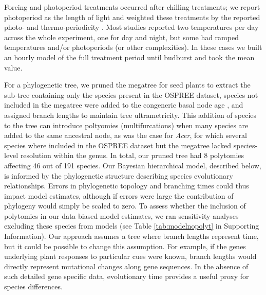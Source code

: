 \documentclass[11pt]{article}
\begin{document}
Forcing and photoperiod treatments occurred after chilling treatments; we report photoperiod as the length of light and weighted these treatments by the reported photo- and thermo-periodicity \citep{buonaiuto2023experimental}. Most studies reported two temperatures per day across the whole experiment, one for day and night, but some had ramped temperatures and/or photoperiods (or other complexities). In these cases we built an hourly model of the full treatment period until budburst and took the mean value. %

For a phylogenetic tree, we pruned the megatree for seed plants \citep{smith2018constructing} to extract the sub-tree containing only the species present in the OSPREE dataset, species not included in the megatree were added to the congeneric basal node age \citep[using the function `congeneric.merge' in][]{pearse2015pez}, and assigned branch lengths to maintain tree ultrametricity. This addition of species to the tree can introduce poltyomies (multifurcations) when many species are added to the same ancestral node, as was the case for \emph{Acer}, for which several species where included in the OSPREE dataset but the megatree lacked species-level resolution within the genus. In total, our pruned tree had 8 polytomies affecting 46 out of 191 species. Our Bayesian hierarchical model, described below, is informed by the phylogenetic structure describing species evolutionary relationships. Errors in phylogenetic topology and branching times could thus impact model estimates, although if errors were large the contribution of phylogeny would simply be scaled to zero. To assess whether the inclusion of polytomies in our data biased model estimates, we ran sensitivity analyses excluding these species from models (see Table \ref{tab:modelnopolyt} in Supporting Information). Our approach assumes a tree where branch lengths represent time, but it could be possible to change this assumption. For example, if the genes underlying plant responses to particular cues were known, branch lengths would directly represent mutational changes along gene sequences. In the absence of such detailed gene specific data, evolutionary time provides a useful proxy for species differences.\\ %
\end{document}
